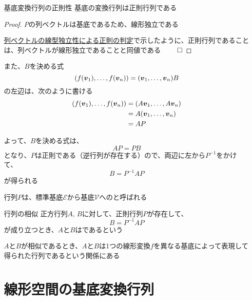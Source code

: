 \documentclass[../../../topic_linear-algebra]{subfiles}
\begin{document}
\begin{theorem}{基底変換行列の正則性}
  基底の変換行列は正則行列である
\end{theorem}

\begin{proof}
  $P$の列ベクトルは基底であるため、線形独立である

  \hyperref[thm:invertible-iff-col-indep]{列ベクトルの線型独立性による正則の判定}で示したように、正則行列であることは、列ベクトルが線形独立であることと同値である $\qed$
\end{proof}

また、$B$を決める式
\begin{equation*}
  (f(\vb*{v}_1), \ldots, f(\vb*{v}_n)) = (\vb*{v}_1, \ldots, \vb*{v}_n) B
\end{equation*}
の左辺は、次のように書ける
\begin{align*}
  (f(\vb*{v}_1), \ldots, f(\vb*{v}_n)) & = (A\vb*{v}_1, \ldots, A\vb*{v}_n) \\
                                       & = A (\vb*{v}_1, \ldots, \vb*{v}_n) \\
                                       & = A P
\end{align*}

よって、$B$を決める式は、
\begin{equation*}
  AP = PB
\end{equation*}
となり、$P$は正則である（逆行列が存在する）ので、両辺に左から$P^{-1}$をかけて、
\begin{equation*}
  B = P^{-1} A P
\end{equation*}
が得られる

\br

行列$P$は、標準基底$\mathcal{E}$から基底$\mathcal{V}$へのと呼ばれる

\sectionline

\begin{definition}{行列の相似}\label{def:similar-matrices}
  正方行列$A,\,B$に対して、正則行列$P$が存在して、
  \begin{equation*}
    B = P^{-1} A P
  \end{equation*}
  が成り立つとき、$A$と$B$はであるという
\end{definition}

$A$と$B$が相似であるとき、$A$と$B$は1つの線形変換$f$を異なる基底によって表現して得られた行列であるという関係にある

\sectionline
\section{線形空間の基底変換行列}
\end{document}

